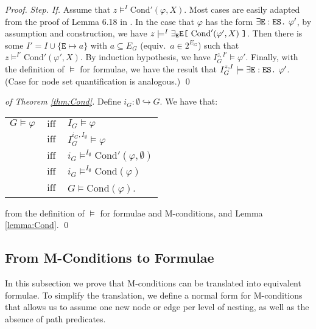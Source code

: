 \documentclass{llncs}
\newcommand{\mt}[1]{\text{\tt{#1}}}
\begin{document}
\begin{proof}
		\noindent \emph{Step. If.} Assume that $z \models^I \text{Cond}'(\varphi,X)$. Most cases are easily adapted from the proof of Lemma 6.18 in \cite{Poskitt13a}. In the case that $\varphi$ has the form $\exists\mathtt{E}:\mathtt{ES}\mt{.}\ \varphi'$, by assumption and construction, we have $z \models^I \exists_\mathtt{E}\mathtt{E}\mt{[}\ \text{Cond}'(\varphi',X)\ \mt{]}$. Then there is some $I' = I \cup \{\mathtt{E}\mapsto a\}$ with $a\subseteq E_G$ (equiv.\ $a\in 2^{E_G}$) such that $z \models^{I'} \text{Cond}'(\varphi',X)$. By induction hypothesis, we have $I_G^{z,I'} \models \varphi'$. Finally, with the definition of $\models$ for formulae, we have the result that $I_G^{z,I} \models \exists\mathtt{E}:\mathtt{ES}\mt{.}\ \varphi'$. (Case for node set quantification is analogous.)		
		\qed
	\end{proof}
	
	\begin{proof}[of Theorem \ref{thm:Cond}]
		Define $i_G\!:\emptyset \hookrightarrow G$. We have that:
		
		\begin{center}\begin{tabular}{r c l}
			$G \models \varphi$ &$\ \text{iff}\ $& $I_G \models \varphi$ \\
			&$\ \text{iff}\ $& $I_G^{i_G,I_\emptyset} \models \varphi$ \\
			&$\ \text{iff}\ $& $i_G \models^{I_\emptyset} \text{Cond}'(\varphi,\emptyset)$ \\
			&$\ \text{iff}\ $& $i_G \models^{I_\emptyset} \text{Cond}(\varphi)$ \\
			&$\ \text{iff}\ $& $G\models \text{Cond}(\varphi)$.
		\end{tabular}\end{center}
		
		\noindent from the definition of $\models$ for formulae and M-conditions, and Lemma \ref{lemma:Cond}.
		\qed
	\end{proof}
	
	
	
	
	
	
	
	
	
	
	
	
	\subsection{From M-Conditions to Formulae}
	
	In this subsection we prove that M-conditions can be translated into equivalent formulae. To simplify the translation, we define a normal form for M-conditions that allows us to assume one new node or edge per level of nesting, as well as the absence of path predicates.
	
\end{document}
